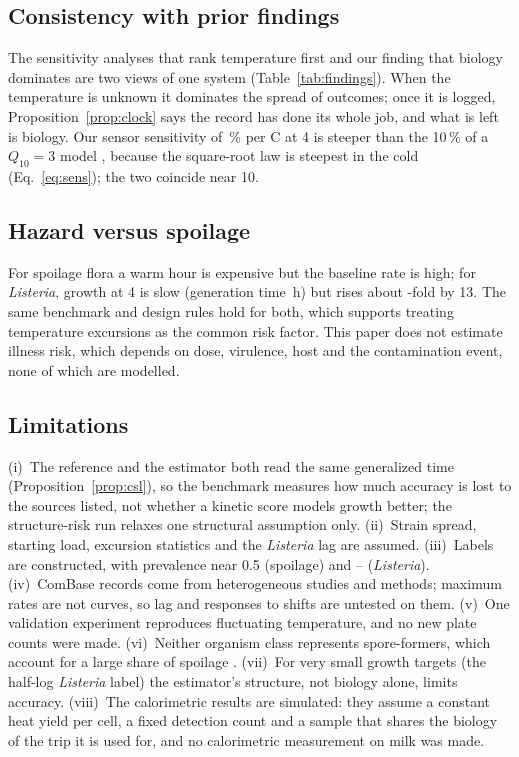 \subsection{Consistency with prior findings}
The sensitivity analyses that rank temperature first \cite{lau2022,buehler2018,qian2023,giannakourou2020} and our finding that biology dominates are two views of one system (Table~\ref{tab:findings}). When the temperature is unknown it dominates the spread of outcomes; once it is logged, Proposition~\ref{prop:clock} says the record has done its whole job, and what is left is biology. Our sensor sensitivity of \AnOneDeg\,\% per \textdegree C at 4\degC{} is steeper than the 10\,\% of a $Q_{10}=3$ model \cite{zou2023}, because the square-root law is steepest in the cold (Eq.~\eqref{eq:sens}); the two coincide near 10\degC.

\subsection{Hazard versus spoilage}
For spoilage flora a warm hour is expensive but the baseline rate is high; for \textit{Listeria}, growth at 4\degC{} is slow (generation time \NumLisGen\,h) but rises about \NumLisRatio-fold by 13\degC. The same benchmark and design rules hold for both, which supports treating temperature excursions as the common risk factor. This paper does not estimate illness risk, which depends on dose, virulence, host and the contamination event, none of which are modelled.

\subsection{Limitations}
(i)~The reference and the estimator both read the same generalized time (Proposition~\ref{prop:csl}), so the benchmark measures how much accuracy is lost to the sources listed, not whether a kinetic score models growth better; the structure-risk run relaxes one structural assumption only. (ii)~Strain spread, starting load, excursion statistics and the \textit{Listeria} lag are assumed. (iii)~Labels are constructed, with prevalence near 0.5 (spoilage) and \NumLisPrevMin--\NumLisPrevMax{} (\textit{Listeria}). (iv)~ComBase records come from heterogeneous studies and methods; maximum rates are not curves, so lag and responses to shifts are untested on them. (v)~One validation experiment reproduces fluctuating temperature, and no new plate counts were made. (vi)~Neither organism class represents spore-formers, which account for a large share of spoilage \cite{martin2021}. (vii)~For very small growth targets (the half-log \textit{Listeria} label) the estimator's structure, not biology alone, limits accuracy. (viii)~The calorimetric results are simulated: they assume a constant heat yield per cell, a fixed detection count and a sample that shares the biology of the trip it is used for, and no calorimetric measurement on milk was made.

